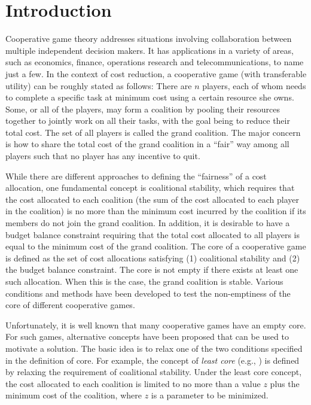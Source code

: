 \documentclass[ijoc,nonblindrev]{informs3} %
\begin{document}
\section{Introduction}
Cooperative game theory addresses situations involving collaboration between multiple independent decision makers. It has applications in a variety of areas, such as economics, finance, operations research and telecommunications, to name just a few. In the context of cost reduction, a cooperative game (with transferable utility) can be roughly stated as follows: There are $n$ players, each of whom needs to complete a specific task at minimum cost using a certain resource she owns. Some, or all of the players, may form a coalition by pooling their resources together to jointly work on all their tasks, with the goal being to reduce their total cost. The set of all players is called the grand coalition. The major concern is how to share the total cost of the grand coalition in a ``fair'' way among all players such that no player has any incentive to quit.

While there are different approaches to defining the ``fairness'' of a cost allocation, one fundamental concept is coalitional stability, which requires that the cost allocated to each coalition (the sum of the cost allocated to each player in the coalition) is  no more than the minimum cost incurred by the coalition if its members do not join the grand coalition. In addition, it is desirable to have a budget balance constraint requiring that the total cost allocated to all players is equal to the minimum cost of the grand coalition.  
The core of a cooperative game is defined as the set of cost allocations satisfying (1) coalitional stability and (2) the budget balance constraint.
The core is not empty if there exists at least one such allocation. When this is the case, the grand coalition is stable. Various conditions and methods have been developed to test the non-emptiness of the core of different cooperative games.

Unfortunately, it is well known that many cooperative games have an empty core. For such games, alternative concepts have been proposed that can be used to motivate a solution. The basic idea is to relax one of the two conditions specified in the definition of core. For example, the concept of {\em least core} (e.g., \citealt{maschler1979geometric,Kern2003,Uhan2010,Uhan2013LeastCore}) is defined by relaxing the requirement of coalitional stability.  Under the least core concept, the cost allocated to each coalition is limited to no more than a value $z$ plus the minimum cost of the coalition, where $z$ is a parameter to be minimized. %
\end{document}
